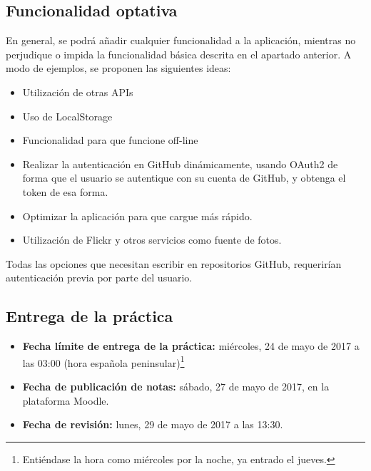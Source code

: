 \subsection{Funcionalidad optativa}

En general, se podrá añadir cualquier funcionalidad a la aplicación, mientras no perjudique o impida la funcionalidad básica descrita en el apartado anterior. A modo de ejemplos, se proponen las siguientes ideas:

\begin{itemize}
  \item Utilización de otras APIs
  \item Uso de LocalStorage
  \item Funcionalidad para que funcione off-line
  \item Realizar la autenticación en GitHub dinámicamente, usando OAuth2 de forma que el usuario se autentique con su cuenta de GitHub, y obtenga el token de esa forma.
  \item Optimizar la aplicación para que cargue más rápido.
  \item Utilización de Flickr y otros servicios como fuente de fotos.
\end{itemize}

Todas las opciones que necesitan escribir en repositorios GitHub, requerirían autenticación previa por parte del usuario.

\subsection{Entrega de la práctica}

\begin{itemize}
  \item \textbf{Fecha límite de entrega de la práctica:} miércoles, 24 de mayo de 2017 a las 03:00 (hora española peninsular)\footnote{Entiéndase la hora como miércoles por la noche, ya entrado el jueves.}

  \item \textbf{Fecha de publicación de notas:} sábado, 27 de mayo de 2017, en la plataforma Moodle.

  \item \textbf{Fecha de revisión:} lunes, 29 de mayo de 2017 a las 13:30.
\end{itemize}

